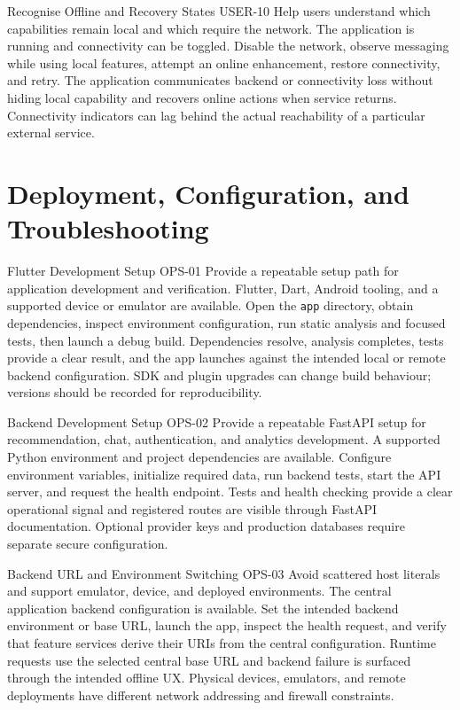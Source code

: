 \EvidenceSheet
{Recognise Offline and Recovery States}
{USER-10}
{Help users understand which capabilities remain local and which require the network.}
{The application is running and connectivity can be toggled.}
{Disable the network, observe messaging while using local features, attempt an online enhancement, restore connectivity, and retry.}
{The application communicates backend or connectivity loss without hiding local capability and recovers online actions when service returns.}
{Connectivity indicators can lag behind the actual reachability of a particular external service.}

\chapter{Deployment, Configuration, and Troubleshooting}
\label{app:operations}

\EvidenceSheet
{Flutter Development Setup}
{OPS-01}
{Provide a repeatable setup path for application development and verification.}
{Flutter, Dart, Android tooling, and a supported device or emulator are available.}
{Open the \texttt{app} directory, obtain dependencies, inspect environment configuration, run static analysis and focused tests, then launch a debug build.}
{Dependencies resolve, analysis completes, tests provide a clear result, and the app launches against the intended local or remote backend configuration.}
{SDK and plugin upgrades can change build behaviour; versions should be recorded for reproducibility.}

\EvidenceSheet
{Backend Development Setup}
{OPS-02}
{Provide a repeatable FastAPI setup for recommendation, chat, authentication, and analytics development.}
{A supported Python environment and project dependencies are available.}
{Configure environment variables, initialize required data, run backend tests, start the API server, and request the health endpoint.}
{Tests and health checking provide a clear operational signal and registered routes are visible through FastAPI documentation.}
{Optional provider keys and production databases require separate secure configuration.}

\EvidenceSheet
{Backend URL and Environment Switching}
{OPS-03}
{Avoid scattered host literals and support emulator, device, and deployed environments.}
{The central application backend configuration is available.}
{Set the intended backend environment or base URL, launch the app, inspect the health request, and verify that feature services derive their URIs from the central configuration.}
{Runtime requests use the selected central base URL and backend failure is surfaced through the intended offline UX.}
{Physical devices, emulators, and remote deployments have different network addressing and firewall constraints.}

